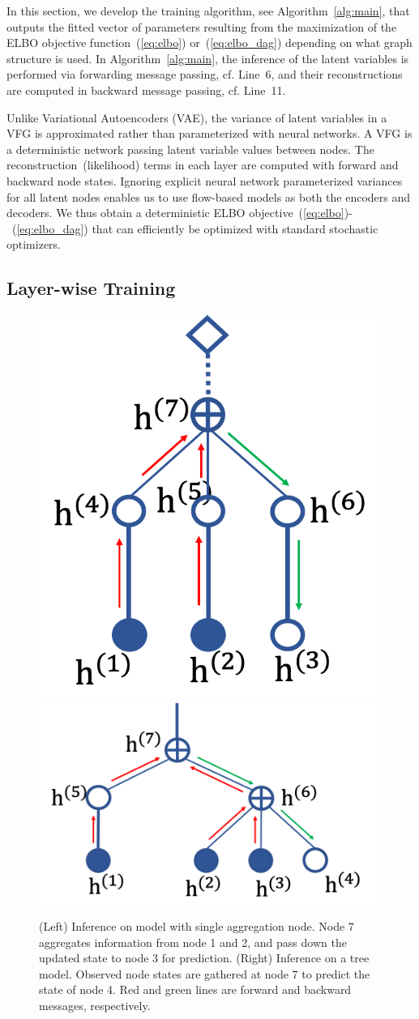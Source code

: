\documentclass{article}
\begin{document}
In this section, we develop the training algorithm, see Algorithm~\ref{alg:main}, that outputs the fitted vector of parameters resulting from the maximization of the ELBO objective function~(\ref{eq:elbo}) or~(\ref{eq:elbo_dag}) depending on what graph structure is used.
In Algorithm~\ref{alg:main}, the inference of the latent variables is performed via forwarding message passing, cf. Line~6, and their reconstructions are computed in backward message passing, cf. Line~11.

Unlike Variational Autoencoders (VAE), the variance of latent variables in a VFG is approximated rather than parameterized with neural networks. 
A VFG is a deterministic network passing latent variable values between nodes. 
The reconstruction~(likelihood) terms in each layer are computed with forward and backward node states. 
Ignoring explicit neural network parameterized variances for all latent nodes enables us to use flow-based models as both the encoders and decoders. 
We thus obtain a deterministic ELBO objective~(\ref{eq:elbo})-~(\ref{eq:elbo_dag}) that can efficiently be optimized with standard stochastic optimizers. 

\subsection{Layer-wise Training}
\begin{figure}
\vspace{-0.7in}
\begin{center}
 \includegraphics[width=0.32\linewidth]{fig/two_layer_infer.png}
 \includegraphics[width=0.62\linewidth]{fig/tree_infer.png}
\end{center}
\vspace{-0.1in}
 \caption{{\small (Left) Inference on model with single aggregation node. Node 7 aggregates information from node 1 and 2, and  pass down the updated state to node 3 for prediction. (Right) Inference on a tree model. Observed node states are gathered at node 7 to predict the state of node 4. Red and green lines are forward and backward messages, respectively.}}
\label{fig:two_layer_infer}
\vspace{-0.1in}
\end{figure}
\end{document}
